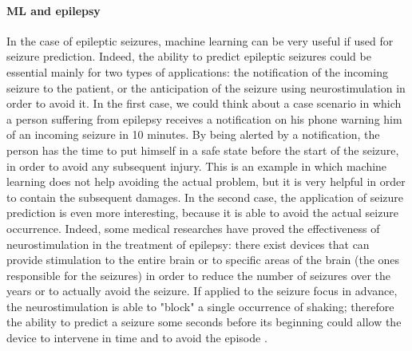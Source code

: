 \paragraph{ML and epilepsy} In the case of epileptic seizures, machine learning can be very useful if used for seizure prediction. Indeed, the ability to predict epileptic seizures could be essential mainly for two types of applications: the notification of the incoming seizure to the patient, or the anticipation of the seizure using neurostimulation in order to avoid it. In the first case, we could think about a case scenario in which a person suffering from epilepsy receives a notification on his phone warning him of an incoming seizure in 10 minutes. By being alerted by a notification, the person has the time to put himself in a safe state before the start of the seizure, in order to avoid any subsequent injury. This is an example in which machine learning does not help avoiding the actual problem, but it is very helpful in order to contain the subsequent damages. In the second case, the application of seizure prediction is even more interesting, because it is able to avoid the actual seizure occurrence. Indeed, some medical researches \cite{NCBI:Neurostimulation} have proved the effectiveness of neurostimulation in the treatment of epilepsy: there exist devices that can provide stimulation to the entire brain or to specific areas of the brain (the ones responsible for the seizures) in order to reduce the number of seizures over the years or to actually avoid the seizure. If applied to the seizure focus in advance, the neurostimulation is able to "block" a single occurrence of shaking; therefore the ability to predict a seizure some seconds before its beginning could allow the device to intervene in time and to avoid the episode \cite{EF:Neurostimulation}.

